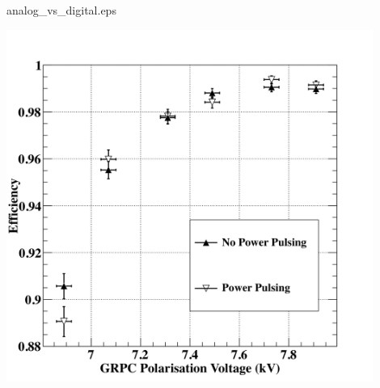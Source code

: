 \begin{frame}{analog\_vs\_digital.eps}
  \centerline{\includegraphics[width=0.9\textwidth]{images/PowerPulsingHvScan}}
\end{frame}

